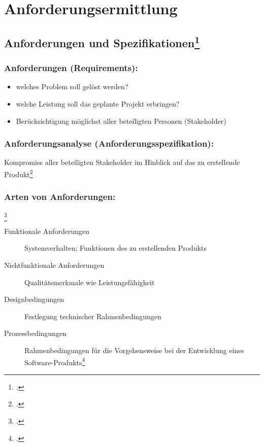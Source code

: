 \documentclass{lehramt-informatik-haupt}
\begin{document}

\chapter{Anforderungsermittlung}

%

\section{Anforderungen und Spezifikationen\footcite[Seite 13]{sosy:fs:1}}

\subsection{Anforderungen (Requirements):}

\begin{itemize}
\item welches Problem soll gelöst werden?
\item welche Leistung soll das geplante Projekt erbringen?
\item Berücksichtigung möglichst aller beteiligten Personen (Stakeholder)
\end{itemize}

\subsection{Anforderungsanalyse (Anforderungsspezifikation):}

Kompromiss aller beteiligten Stakeholder im Hinblick auf das zu
erstellende Produkt\footcite[Seite 17-20]{schatten}

\subsection{Arten von Anforderungen:}\footcite[Seite 14]{sosy:fs:1}

\begin{description}
\item[Funktionale Anforderungen]
Systemverhalten; Funktionen des zu erstellenden Produkts

\item[Nichtfunktionale Anforderungen]
Qualitätsmerkmale wie \zB Leistungsfähigkeit

\item[Designbedingungen]
Festlegung technischer Rahmenbedingungen

\item[Prozessbedingungen]
Rahmenbedingungen für die Vorgehensweise bei der Entwicklung eines
Software-Produkts\footcite[Seite 20-22]{text}
\end{description}
\end{document}
